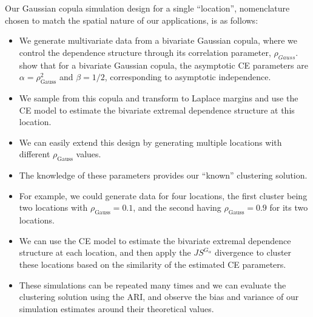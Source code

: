 \documentclass{article}
\numberwithin{equation}{section}
\begin{document}
Our Gaussian copula simulation design for a single ``location'', nomenclature chosen to match the spatial nature of our applications, is as follows:
\begin{itemize}
  \item We generate multivariate data from a bivariate Gaussian copula, where we control the dependence structure through its correlation parameter, $\rho_{Gauss}$. 
    \cite{Keef2013} show that for a bivariate Gaussian copula, the asymptotic CE parameters are $\alpha = \rho_{\text{Gauss}}^2$ and $\beta = 1/2$, corresponding to asymptotic independence.
  \item We sample from this copula and transform to Laplace margins and use the CE model to estimate the bivariate extremal dependence structure at this location.
\end{itemize}

\vspace{1cm}

\begin{itemize}
  \item We can easily extend this design by generating multiple locations with different $\rho_{\text{Gauss}}$ values.
  \item The knowledge of these parameters provides our ``known'' clustering solution.
  \item For example, we could generate data for four locations, the first cluster being two locations with $\rho_{\text{Gauss}} = 0.1$, and the second having $\rho_{\text{Gauss}} = 0.9$ for its two locations.
  \item We can use the CE model to estimate the bivariate extremal dependence structure at each location, and then apply the $JS^{G_{\alpha}}$ divergence to cluster these locations based on the similarity of the estimated CE parameters.
  \item These simulations can be repeated many times and we can evaluate the clustering solution using the ARI, and observe the bias and variance of our simulation estimates around their theoretical values.
\end{itemize}
\end{document}

